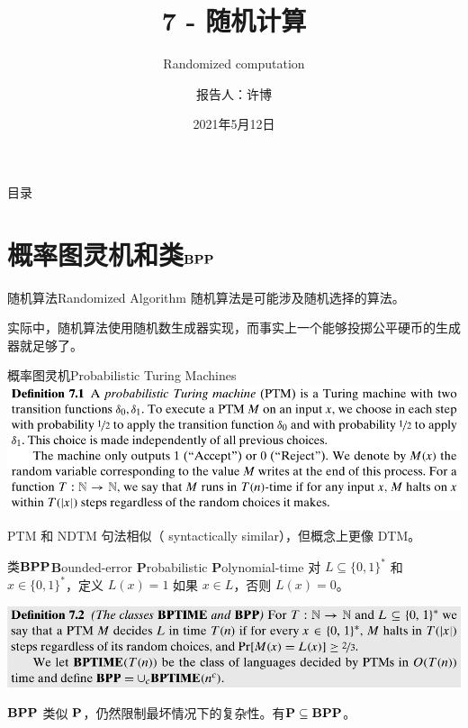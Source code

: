 \documentclass[UTF8,aspectratio=169,mathserif]{beamer}
\title{7 - 随机计算}
\subtitle{Randomized computation}
\author{报告人：许博}
\date{2021年5月12日}
\begin{document}
	
	\begin{frame}
		\titlepage
	\end{frame}

	\begin{frame}{目录}
		\tableofcontents
	\end{frame}

	\section{概率图灵机和类$\bf BPP$}
	\begin{frame}{随机算法}{Randomized Algorithm}
		随机算法是可能涉及随机选择的算法。\newline
		
		实际中，随机算法使用随机数生成器实现，\newline 而事实上一个能够投掷公平硬币的生成器就足够了。
	\end{frame}
	
	\begin{frame}{概率图灵机}{Probabilistic Turing Machines}
		\includegraphics[width=\linewidth]{../../7/note.assets/image-20210508132612511.png}\newline
		
		PTM 和 NDTM 句法相似（ syntactically similar），但概念上更像 DTM。
	\end{frame}
	
	\begin{frame}{类$\bf BPP$}{\textbf{B}ounded-error \textbf{P}robabilistic \textbf{P}olynomial-time}
		对 $L\subseteq\{0,1\}^*$ 和 $x\in\{0,1\}^*$，定义 $L(x)=1$ 如果 $x\in L$，否则 $L(x)=0$。\newline
		
		\includegraphics[width=\linewidth]{../../7/note.assets/image-20210508132647720.png}\newline
		
		$\bf BPP$ 类似 $\bf P$，仍然限制最坏情况下的复杂性。有$\bf P\subseteq BPP$。
	\end{frame}
\end{document}
